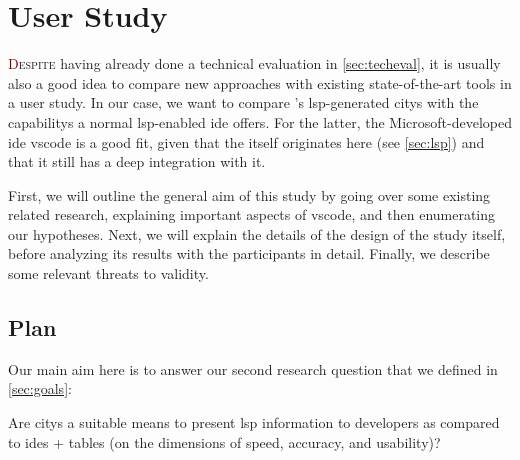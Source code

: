 \documentclass[../thesis]{subfiles}
\begin{document}
\chapter{User Study}\label{ch:evaluation}

\lettrine[lines=3]{\textcolor{Maroon}{D}}{espite} having already done a technical evaluation in \cref{sec:techeval}, it is usually also a good idea to compare new approaches with existing state-of-the-art tools in a user study.
In our case, we want to compare \SEE{}'s \gls{lsp}-generated \glspl{city} with the \glspl{capability} a normal \gls{lsp}-enabled \gls{ide} offers.
For the latter, the Microsoft-developed \gls{ide} \gls{vscode} is a good fit, given that the  itself originates here (see \cref{sec:lsp}) and that it still has a deep integration with it.

First, we will outline the general aim of this study by going over some existing related research, explaining important aspects of \gls{vscode}, and then enumerating our hypotheses.
Next, we will explain the details of the design of the study itself, before analyzing its results with the \participants{} participants in detail.
Finally, we describe some relevant threats to validity.

\section{Plan}  %
Our main aim here is to answer our second research question that we defined in \cref{sec:goals}:
\begin{displayquote}
	Are \glspl{city} a suitable means to present \gls{lsp} information to developers as compared to \glspl{ide} + tables (on the dimensions of speed, accuracy, and usability)?
\end{displayquote}
\end{document}
